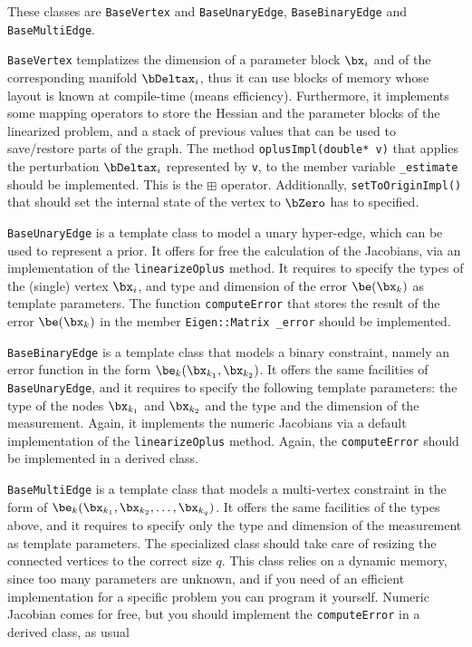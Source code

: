 \documentclass[a4paper]{article}
\begin{document}
These classes are \verb+BaseVertex+ and \verb+BaseUnaryEdge+,
\verb+BaseBinaryEdge+ and \verb+BaseMultiEdge+. 
\begin{description}
\item \verb+BaseVertex+ templatizes the dimension of a parameter block
  $\bx_i$ and of the corresponding manifold $\bDeltax_i$, thus it can 
  use blocks of memory whose layout is known at compile-time (means
  efficiency). Furthermore, it implements some mapping operators to
  store the Hessian and the parameter blocks of the linearized
  problem, and a stack of previous values that can be used to
  save/restore parts of the graph.  The method \verb+oplusImpl(double* v)+
  that applies the perturbation $\bDeltax_i$ represented by \verb+v+,
  to the member variable \verb+_estimate+ should be implemented. This
  is the $\boxplus$ operator. Additionally,
  \verb+setToOriginImpl()+ that should set the internal state of the vertex
  to $\bZero$ has to specified.

\item \verb+BaseUnaryEdge+ is a template class to model a unary
  hyper-edge, which can be used to represent a prior. It offers for
  free the calculation of the Jacobians, via an implementation of the
  \verb+linearizeOplus+ method. It requires to specify the types of
  the (single) vertex $\bx_i$, and type and dimension of the error 
  $\be(\bx_k)$ as template parameters.  The function
  \verb+computeError+ that stores the result of the error $\be(\bx_k)$ in the
  member \verb+Eigen::Matrix _error+ should be implemented.

\item \verb+BaseBinaryEdge+ is a template class that models a binary
  constraint, namely an error function in the form $\be_k(\bx_{k_1},
  \bx_{k_2})$. It offers the same facilities of \verb+BaseUnaryEdge+, and it
  requires to specify the following template parameters: the type of the nodes
  $\bx_{k_1}$ and $\bx_{k_2}$  and the  type and the dimension of the measurement. 
  Again, it implements the numeric Jacobians via
  a default implementation of the \verb+linearizeOplus+ method.
  Again, the \verb+computeError+ should be implemented in a derived class.

\item \verb+BaseMultiEdge+ is a template class that models a
  multi-vertex constraint in the form of $\be_k(\bx_{k_1}, \bx_{k_2},
  \ldots, \bx_{k_q})$. It offers the same facilities of the types
  above, and it requires to specify only the type and dimension of the
  measurement as template parameters. The specialized class should
  take care of resizing the connected vertices to the correct size
  $q$.  This class relies on a dynamic memory, since too many
  parameters are unknown, and if you need of an efficient
  implementation for a specific problem you can program it yourself.
  Numeric Jacobian comes for free, but you should implement the
  \verb+computeError+ in a derived class, as usual
\end{description}
\end{document}
